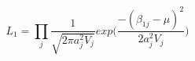 \begin{equation}
\label{mle}
L_1 = \prod\limits_j\frac{1}{\sqrt{2\pi a_j^2 V_j}}exp\Big(\frac{-(\beta_{1j}- \mu)^2}{2 a_j^2 V_j}\Big)
\end{equation}



